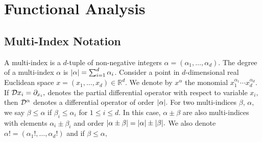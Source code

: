 \chapter{Functional Analysis}

\section{Multi-Index Notation}
A multi-index is a $d$-tuple of non-negative integers $\alpha=(\alpha_1,\dotsc,\alpha_d).$ The degree of a multi-index $\alpha$ is $\abs{\alpha}=\sum_{i=1}^d\alpha_i$. Consider a point in $d$-dimensional real Euclidean space $x=(x_1,\dotsc,x_d)\in\mathbb{R}^d.$ We denote by $x^\alpha$ the monomial $x_1^{\alpha_1}\cdots x_d^{\alpha_d}.$ If $\mathcal{D}{x_i}=\partial_{x_i},$ denotes the partial differential operator with respect to variable $x_i,$ then 
$\mathcal{D}^\alpha$ denotes a differential operator of order $\abs{\alpha}.$
For two multi-indices $\beta,\,\alpha,$ we say $\beta\leq\alpha$ if $\beta_i\leq\alpha_i$ for $1\leq i\leq d.$ In this case, $\alpha\pm\beta$ are also multi-indices with elements $\alpha_i\pm\beta_i$ and order $\abs{\alpha\pm\beta}=\abs{\alpha}\pm\abs{\beta}.$ We also denote $\alpha!=(\alpha_1!,\dotsc,\alpha_d!)$ and if $\beta\leq\alpha,$

